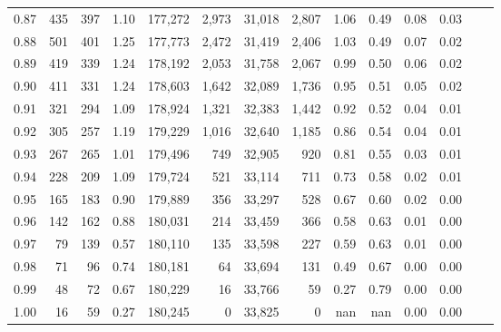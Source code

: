 \begin{tabular}{rrrrrrrrrrrrrr}
0.87 &    435 &  397 &    1.10 &  177,272 &    2,973 &  31,018 &   2,807 &  1.06 &  0.49 &  0.08 &      0.03 \\
0.88 &    501 &  401 &    1.25 &  177,773 &    2,472 &  31,419 &   2,406 &  1.03 &  0.49 &  0.07 &      0.02 \\
0.89 &    419 &  339 &    1.24 &  178,192 &    2,053 &  31,758 &   2,067 &  0.99 &  0.50 &  0.06 &      0.02 \\
0.90 &    411 &  331 &    1.24 &  178,603 &    1,642 &  32,089 &   1,736 &  0.95 &  0.51 &  0.05 &      0.02 \\
0.91 &    321 &  294 &    1.09 &  178,924 &    1,321 &  32,383 &   1,442 &  0.92 &  0.52 &  0.04 &      0.01 \\
0.92 &    305 &  257 &    1.19 &  179,229 &    1,016 &  32,640 &   1,185 &  0.86 &  0.54 &  0.04 &      0.01 \\
0.93 &    267 &  265 &    1.01 &  179,496 &      749 &  32,905 &     920 &  0.81 &  0.55 &  0.03 &      0.01 \\
0.94 &    228 &  209 &    1.09 &  179,724 &      521 &  33,114 &     711 &  0.73 &  0.58 &  0.02 &      0.01 \\
0.95 &    165 &  183 &    0.90 &  179,889 &      356 &  33,297 &     528 &  0.67 &  0.60 &  0.02 &      0.00 \\
0.96 &    142 &  162 &    0.88 &  180,031 &      214 &  33,459 &     366 &  0.58 &  0.63 &  0.01 &      0.00 \\
0.97 &     79 &  139 &    0.57 &  180,110 &      135 &  33,598 &     227 &  0.59 &  0.63 &  0.01 &      0.00 \\
0.98 &     71 &   96 &    0.74 &  180,181 &       64 &  33,694 &     131 &  0.49 &  0.67 &  0.00 &      0.00 \\
0.99 &     48 &   72 &    0.67 &  180,229 &       16 &  33,766 &      59 &  0.27 &  0.79 &  0.00 &      0.00 \\
1.00 &     16 &   59 &    0.27 &  180,245 &        0 &  33,825 &       0 &   nan &   nan &  0.00 &      0.00 \\
\bottomrule
\end{tabular}
